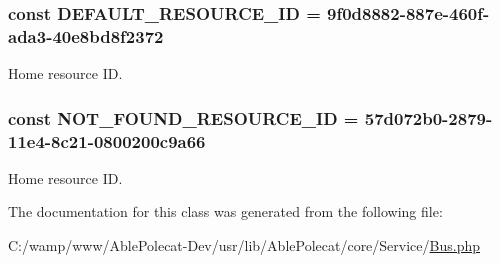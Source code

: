 \subsubsection[{D\+E\+F\+A\+U\+L\+T\+\_\+\+R\+E\+S\+O\+U\+R\+C\+E\+\_\+\+I\+D}]{\setlength{\rightskip}{0pt plus 5cm}const D\+E\+F\+A\+U\+L\+T\+\_\+\+R\+E\+S\+O\+U\+R\+C\+E\+\_\+\+I\+D = \textquotesingle{}9f0d8882-\/887e-\/460f-\/ada3-\/40e8bd8f2372\textquotesingle{}}\label{class_able_polecat___service___bus_a6812e1b07c5d6333a734e863afdd3231}
\textquotesingle{}Home\textquotesingle{} resource I\+D. \hypertarget{class_able_polecat___service___bus_a9df65a1efe90e8bb8d0e234da978a2db}{}
\subsubsection[{N\+O\+T\+\_\+\+F\+O\+U\+N\+D\+\_\+\+R\+E\+S\+O\+U\+R\+C\+E\+\_\+\+I\+D}]{\setlength{\rightskip}{0pt plus 5cm}const N\+O\+T\+\_\+\+F\+O\+U\+N\+D\+\_\+\+R\+E\+S\+O\+U\+R\+C\+E\+\_\+\+I\+D = \textquotesingle{}57d072b0-\/2879-\/11e4-\/8c21-\/0800200c9a66\textquotesingle{}}\label{class_able_polecat___service___bus_a9df65a1efe90e8bb8d0e234da978a2db}
\textquotesingle{}Home\textquotesingle{} resource I\+D. 

The documentation for this class was generated from the following file\+:\begin{DoxyCompactItemize}
\item 
C\+:/wamp/www/\+Able\+Polecat-\/\+Dev/usr/lib/\+Able\+Polecat/core/\+Service/\hyperlink{_bus_8php}{Bus.\+php}\end{DoxyCompactItemize}
